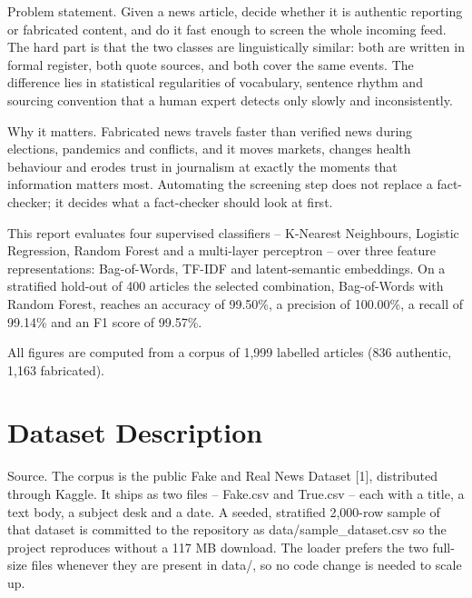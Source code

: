 \documentclass[conference,a4paper]{IEEEtran}
\begin{document}
Problem statement. Given a news article, decide whether it is authentic reporting or fabricated content, and do it fast enough to screen the whole incoming feed. The hard part is that the two classes are linguistically similar: both are written in formal register, both quote sources, and both cover the same events. The difference lies in statistical regularities of vocabulary, sentence rhythm and sourcing convention that a human expert detects only slowly and inconsistently.

Why it matters. Fabricated news travels faster than verified news during elections, pandemics and conflicts, and it moves markets, changes health behaviour and erodes trust in journalism at exactly the moments that information matters most. Automating the screening step does not replace a fact-checker; it decides what a fact-checker should look at first.

This report evaluates four supervised classifiers -- K-Nearest Neighbours, Logistic Regression, Random Forest and a multi-layer perceptron -- over three feature representations: Bag-of-Words, TF-IDF and latent-semantic embeddings. On a stratified hold-out of 400 articles the selected combination, Bag-of-Words with Random Forest, reaches an accuracy of 99.50\%, a precision of 100.00\%, a recall of 99.14\% and an F1 score of 99.57\%.

All figures are computed from a corpus of 1,999 labelled articles (836 authentic, 1,163 fabricated).

\section{Dataset Description}

Source. The corpus is the public Fake and Real News Dataset [1], distributed through Kaggle. It ships as two files -- Fake.csv and True.csv -- each with a title, a text body, a subject desk and a date. A seeded, stratified 2,000-row sample of that dataset is committed to the repository as data/sample\_dataset.csv so the project reproduces without a 117 MB download. The loader prefers the two full-size files whenever they are present in data/, so no code change is needed to scale up.
\end{document}
